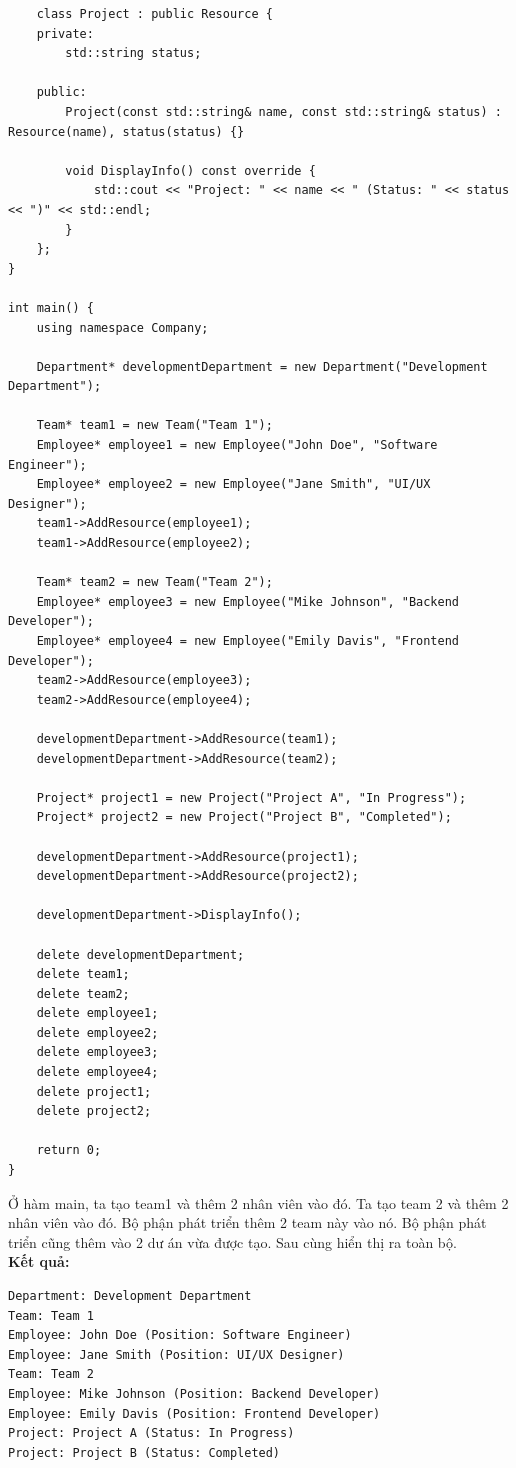 \begin{lstlisting}
    class Project : public Resource {
    private:
        std::string status;

    public:
        Project(const std::string& name, const std::string& status) : Resource(name), status(status) {}

        void DisplayInfo() const override {
            std::cout << "Project: " << name << " (Status: " << status << ")" << std::endl;
        }
    };
}

int main() {
    using namespace Company;

    Department* developmentDepartment = new Department("Development Department");

    Team* team1 = new Team("Team 1");
    Employee* employee1 = new Employee("John Doe", "Software Engineer");
    Employee* employee2 = new Employee("Jane Smith", "UI/UX Designer");
    team1->AddResource(employee1);
    team1->AddResource(employee2);

    Team* team2 = new Team("Team 2");
    Employee* employee3 = new Employee("Mike Johnson", "Backend Developer");
    Employee* employee4 = new Employee("Emily Davis", "Frontend Developer");
    team2->AddResource(employee3);
    team2->AddResource(employee4);

    developmentDepartment->AddResource(team1);
    developmentDepartment->AddResource(team2);

    Project* project1 = new Project("Project A", "In Progress");
    Project* project2 = new Project("Project B", "Completed");

    developmentDepartment->AddResource(project1);
    developmentDepartment->AddResource(project2);

    developmentDepartment->DisplayInfo();

    delete developmentDepartment;
    delete team1;
    delete team2;
    delete employee1;
    delete employee2;
    delete employee3;
    delete employee4;
    delete project1;
    delete project2;

    return 0;
}

\end{lstlisting}
Ở hàm main, ta tạo team1 và thêm 2 nhân viên vào đó. Ta tạo team 2 và thêm 2 nhân viên vào đó. Bộ phận phát triển thêm 2 team này vào nó. Bộ phận phát triển cũng thêm vào 2 dư án vừa được tạo. Sau cùng hiển thị ra toàn bộ.\\
\newline
\textbf{Kết quả:}
\begin{lstlisting}
Department: Development Department
Team: Team 1
Employee: John Doe (Position: Software Engineer)
Employee: Jane Smith (Position: UI/UX Designer)
Team: Team 2
Employee: Mike Johnson (Position: Backend Developer)
Employee: Emily Davis (Position: Frontend Developer)
Project: Project A (Status: In Progress)
Project: Project B (Status: Completed)

\end{lstlisting}
